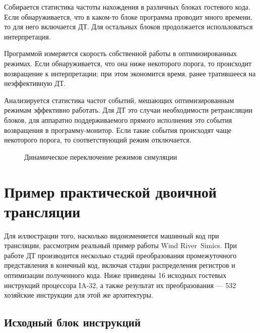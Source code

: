 \begin{itemize*}
\item Собирается статистика частоты нахождения в различных блоках гостевого кода. Если обнаруживается, что в каком-то блоке программа проводит много времени, то для него включается ДТ. Для остальных блоков продолжается использоваться интерпретация.

\item Программой измеряется скорость собственной работы в оптимизированных режимах. Если обнаруживается, что она ниже некоторого порога, то происходит  возвращение к интерпретации; при этом экономится время, ранее тратившееся на неэффективную ДТ.

\item Анализируется статистика частот событий, мешающих оптимизированным режимам эффективно работать. Для ДТ это случаи необходимости ретрансляции блоков, для аппаратно поддерживаемого прямого исполнения это события возвращения в программу-монитор. Если такие события происходят чаще некоторого порога, то соответствующий режим отключается.
\end{itemize*}


\begin{figure}[htb]
    \centering
    \caption[Динамическое переключение режимов симуляции]{Динамическое переключение режимов симуляции}
    \label{fig:gearbox}
\end{figure}


\section[Пример практической двоичной трансляции]{Пример практической двоичной трансляции}

Для иллюстрации того, насколько видоизменяется машинный код при трансляции, рассмотрим реальный пример работы Wind River\textregistered~Simics. При работе ДТ производится несколько стадий преобразования промежуточного представления в конечный код, включая стадии распределения регистров и оптимизации полученного кода. Ниже приведены 16 исходных гостевых инструкций процессора IA-32, а также результат их преобразования — 532 хозяйские инструкции для этой же архитектуры.

\subsection{Исходный блок инструкций}

